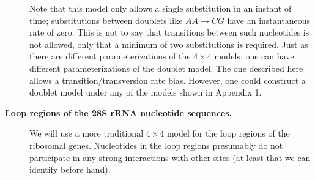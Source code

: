 \documentclass{svmult}
\begin{document}
\begin{description}
Note that this model only allows a single substitution in an instant of time; substitutions between doublets like $AA \rightarrow CG$ have an instantaneous rate of zero.
This is not to say that transitions between such nucleotides is not allowed, only that a minimum of two substitutions is required. Just as there are different parameterizations
of the $4 \times 4$ models, one can have different parameterizations of the doublet model. The one described here allows a transition/transversion rate bias. However,
one could construct a doublet model under any of the models shown in Appendix 1. \\

\item[ {\bf Loop regions of the 28S rRNA nucleotide sequences.}] We will use a more traditional $4 \times 4$ model for the loop regions of the ribosomal genes. Nucleotides
in the loop regions presumably do not participate in any strong interactions with other sites (at least that we can identify before hand). \\


\end{description}
\end{document}
